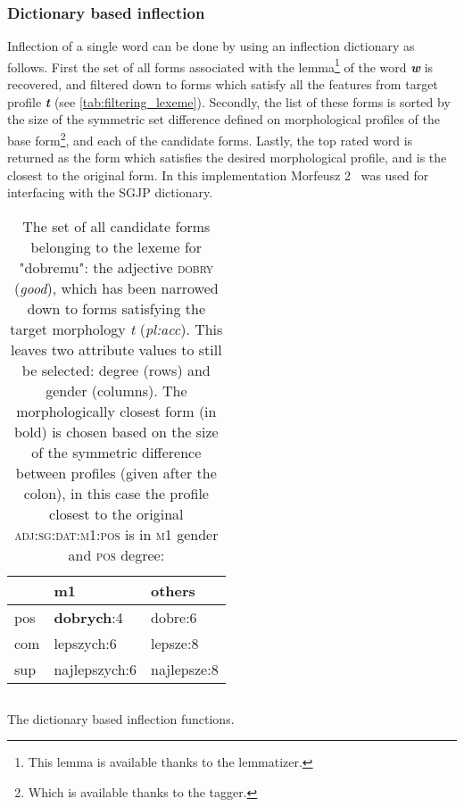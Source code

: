 \documentclass[12pt]{article}
\newcommand{\symbolic}[1]{\textit{\textbf{#1}}}
\begin{document}
\subsubsection{Dictionary based inflection}
Inflection of a single word can be done by using an inflection dictionary as follows. First the set of all forms associated with the lemma\footnote{This lemma is available thanks to the lemmatizer.} of the word \symbolic{w} is recovered, and filtered down to forms which satisfy all the features from target profile \symbolic{t} (see \autoref{tab:filtering_lexeme}). Secondly, the list of these forms is sorted by the size of the symmetric set difference defined on morphological profiles of the base form\footnote{Which is available thanks to the tagger.}, and each of the candidate forms. Lastly, the top rated word is returned as the form which satisfies the desired morphological profile, and is the closest to the original form. In this implementation Morfeusz 2~\cite{wol:14} was used for interfacing with the SGJP dictionary.

\begin{table}[H]
\centering
\begin{tabular}{lll}
& m1 & others\\
\midrule
pos      &   \textbf{dobrych}:4 &  dobre:6 \\
com      &   lepszych:6 &   lepsze:8 \\
sup      &   najlepszych:6 &   najlepsze:8 \\
\bottomrule
\end{tabular}
\caption{The set of all candidate forms belonging to the lexeme for "dobremu": the adjective \textsc{dobry} (\textit{good}), which has been narrowed down to forms satisfying the target morphology \textit{t} (\textit{pl:acc}). This leaves two attribute values to still be selected: degree (rows) and gender (columns). The morphologically closest form (in bold) is chosen based on the size of the symmetric difference between profiles (given after the colon), in this case the profile closest to the original \textsc{adj:sg:dat:m1:pos} is in \textsc{m1} gender and \textsc{pos} degree:}  
\label{tab:filtering_lexeme}  
\end{table}

\begin{listing}[htbp]
\inputminted[linenos,tabsize=2,breaklines]{Python}{dict_flex_snippet.py}
\vspace{-10pt}
\caption{The dictionary based inflection functions.}
\label{lst:dict_flex}
\end{listing}
\end{document}
